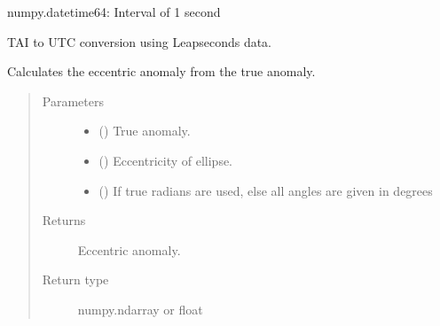 \documentclass[letterpaper,10pt,english]{sphinxmanual}
\begin{document}

\begin{fulllineitems}
\label{\detokenize{modules/dpt_tools:dpt_tools.sec}}
numpy.datetime64: Interval of 1 second

\end{fulllineitems}


\begin{fulllineitems}
\label{\detokenize{modules/dpt_tools:dpt_tools.tai2utc}}
TAI to UTC conversion using Leapseconds data.

\end{fulllineitems}


\begin{fulllineitems}
\label{\detokenize{modules/dpt_tools:dpt_tools.true2eccentric}}
Calculates the eccentric anomaly from the true anomaly.
\begin{quote}\begin{description}
\item[{Parameters}] \leavevmode\begin{itemize}
\item {} 
 () \textendash{} True anomaly.

\item {} 
 () \textendash{} Eccentricity of ellipse.

\item {} 
 () \textendash{} If true radians are used, else all angles are given in degrees

\end{itemize}

\item[{Returns}] \leavevmode
Eccentric anomaly.

\item[{Return type}] \leavevmode
numpy.ndarray or float

\end{description}\end{quote}

\end{fulllineitems}
\end{document}
